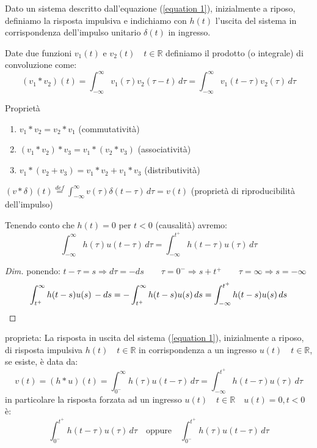 \begin{definizione}
	Dato un sistema descritto dall'equazione (\ref{equation 1}), inizialmente a riposo, definiamo la risposta impulsiva e indichiamo con $h(t)$ l'uscita del sistema in corrispondenza dell'impulso unitario $\delta (t)$ in ingresso.
\end{definizione}

\begin{definizione}
	Date due funzioni $v_1(t)$ e $v_2(t) \quad t\in\mathbb{R} $ definiamo il prodotto (o integrale) di convoluzione come:
	\begin{equation*}
		(v_1 * v_2)(t) 
		= \int_{-\infty}^{\infty}v_1(\tau)v_2(\tau - t)\,d\tau 
		= \int_{-\infty}^{\infty}v_1(t - \tau)v_2(\tau )\,d\tau
	\end{equation*}
	
	Proprietà
	\begin{enumerate}
		\item $v_1 * v_2 = v_2 * v_1 $ (commutatività)
		\item $(v_1 * v_2) * v_3  = v_1 * (v_2 * v_3) $ (associatività)
		\item $v_1 * (v_2 + v_3)  = v_1 * v_2 + v_1 * v_3$ (distributività)
	\end{enumerate}

\begin{osservazione}
	$(v *\delta)(t)\overset{def}{=} \int_{-\infty}^{\infty}v(\tau)\delta(t - \tau)\,d\tau = v(t)$ (proprietà di riproducibilità dell'impulso)
\end{osservazione}
\end{definizione}
Tenendo conto che $h(t)=0$ per $t<0$ (causalità) avremo:
\begin{equation*}
	\int_{-\infty}^{\infty}h(\tau)u(t - \tau)\,d\tau 
	= \int_{-\infty}^{t^+}h(t - \tau)u(\tau)\,d\tau
\end{equation*}
\begin{proof}[Dim]
ponendo:  $t-\tau = s \Rightarrow d\tau = - ds 
\qquad \tau = 0^-  \Rightarrow s+t^+ 
\qquad \tau=\infty \Rightarrow s = -\infty$
\[
\int_{t^+}^{\infty}h(t-s)u(s)\,-ds 
=-\int_{t^+}^{\infty}h(t-s)u(s)\,ds
=\int_{-\infty}^{t^+}h(t-s)u(s)\,ds
\qedhere
\]
\end{proof}

proprieta:
La risposta in uscita del sistema (\ref{equation 1}), inizialmente a riposo, di risposta impulsiva $h(t)\quad t\in\mathbb{R}$ in corrispondenza a un ingresso $u(t)\quad t\in\mathbb{R}$, se esiste, è data da:
\[
v(t)=(h*u)(t) = \int_{0^-}^{\infty}h(\tau)u(t - \tau)\,d\tau
= \int_{-\infty}^{t^+}h(t - \tau)u(\tau)\,d\tau
\]
in particolare la risposta forzata ad un ingresso $u(t)\quad t\in\mathbb{R} \quad u(t)=0 , t<0$ è:
\[
\int_{0^-}^{t^+}h(t - \tau)u(\tau)\,d\tau 
\quad\text{oppure}\quad
\int_{0^-}^{t^+}h(\tau)u(t - \tau)\,d\tau 
\]

